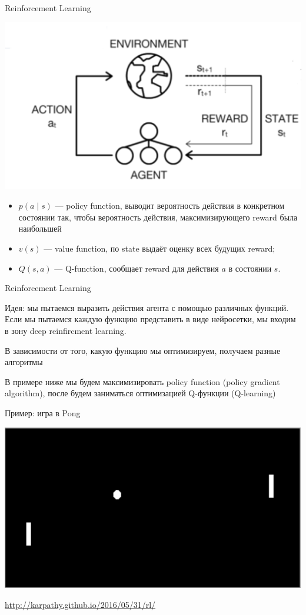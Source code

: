 \documentclass[notes,12pt, aspectratio=169]{beamer}
\newenvironment{wideitemize}{\itemize\addtolength{\itemsep}{10pt}}{\enditemize}
\begin{document}
\begin{frame}{Reinforcement Learning}
\begin{center}
	\includegraphics[width=.4\linewidth]{rl_1.png}
\end{center}
\begin{itemize}
	\item  $p(a \mid s)$ --- policy function, выводит вероятность действия в конкретном состоянии так, чтобы вероятность действия, максимизирующего reward была наибольшей 
	\item  $v(s)$ --- value function, по state выдаёт оценку всех будущих reward;
	\item  $Q(s,a)$ --- Q-function, сообщает reward для действия $a$ в состоянии $s$.
\end{itemize}
\end{frame}


\begin{frame}{Reinforcement Learning}
\begin{wideitemize}
\item \alert{Идея:} мы пытаемся выразить действия агента с помощью различных функций. Если мы пытаемся каждую функцию представить в виде нейросетки, мы входим в зону deep reinfircment learning. 

\item В зависимости от того, какую функцию мы оптимизируем, получаем разные алгоритмы 

\item В примере ниже мы будем максимизировать policy function (policy gradient algorithm), после будем заниматься оптимизацией Q-функции (Q-learning)
\end{wideitemize}
\end{frame}



\begin{frame}{Пример: игра в Pong}
\begin{center}
	\includegraphics[width=.8\linewidth]{pong.png}
\end{center}
\vfill
{\color{blue}  \url{http://karpathy.github.io/2016/05/31/rl/}}
\end{frame}
\end{document}
